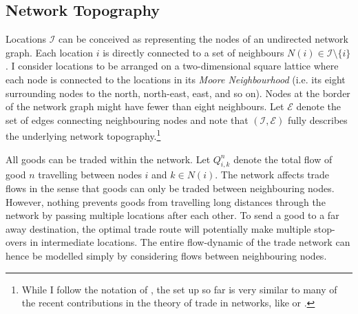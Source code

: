 \documentclass[11pt, oneside]{article}   	%
\begin{document}
\subsection{Network Topography}
Locations $\mathcal{I}$ can be conceived as representing the nodes of an undirected network graph. Each location $i$ is directly connected to a set of neighbours $N(i) \in \mathcal{I} \setminus \{ i\}$. I consider locations to be arranged on a two-dimensional square lattice where each node is connected to the locations in its \emph{Moore Neighbourhood} (i.e. its eight surrounding nodes to the north, north-east, east, and so on). Nodes at the border of the network graph might have fewer than eight neighbours. Let $\mathcal{E}$ denote the set of edges connecting neighbouring nodes and note that $(\mathcal{I}, \mathcal{E})$ fully describes the underlying network topography.\footnote{While I follow the notation of \cite{fajgelbaum_optimal_2017}, the set up so far is very similar to many of the recent contributions in the theory of trade in networks, like \cite{allen_welfare_2016} or \cite{Galichon_OptimalTransportMethods_2016}.}

All goods can be traded within the network. Let $Q_{i,k}^{n}$ denote the total flow of good $n$ travelling between nodes $i$ and $k \in N(i)$. The network affects trade flows in the sense that goods can only be traded between neighbouring nodes. However, nothing prevents goods from travelling long distances through the network by passing multiple locations after each other. To send a good to a far away destination, the optimal trade route will potentially make multiple stop-overs in intermediate locations. The entire flow-dynamic of the trade network can hence be modelled simply by considering flows between neighbouring nodes.
\end{document}
